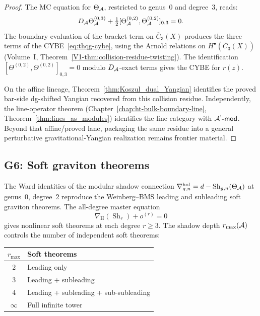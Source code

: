 \begin{proof}
The MC equation for $\Theta_{\mathcal{A}}$, restricted to genus~$0$ and degree~$3$,
reads:
\[
D_{\mathcal{A}} \Theta_{\mathcal{A}}^{(0,3)}
+ \tfrac{1}{2}[\Theta_{\mathcal{A}}^{(0,2)}, \Theta_{\mathcal{A}}^{(0,2)}]_{0,3} = 0.
\]
The boundary evaluation of the bracket term on $\overline{C}_3(X)$
produces the three terms of the CYBE~\eqref{eq:thqg-cybe}, using the
Arnold relations on $H^\bullet(\overline{C}_3(X))$
(Volume~I, Theorem~\ref{V1-thm:collision-residue-twisting}). The
identification $[\Theta^{(0,2)}, \Theta^{(0,2)}]_{0,3} = 0$
modulo $D_{\mathcal{A}}$-exact terms gives the CYBE for $r(z)$.

On the affine lineage, Theorem~\ref{thm:Koszul_dual_Yangian}
identifies the proved bar-side dg-shifted Yangian recovered from this
collision residue. Independently, the line-operator theorem
(Chapter~\ref{chap:ht-bulk-boundary-line},
Theorem~\ref{thm:lines_as_modules}) identifies the line category
with $\mathcal{A}^!\text{-}\mathsf{mod}$. Beyond that affine/proved lane,
packaging the same residue into a general perturbative
gravitational-Yangian realization remains frontier material.
\end{proof}


\subsection{G6: Soft graviton theorems}

\begin{theorem}
The Ward identities of the modular shadow connection
$\nabla^{\mathrm{hol}}_{g,n} = d - \operatorname{Sh}_{g,n}(\Theta_{\mathcal{A}})$
at genus~$0$, degree~$2$ reproduce the Weinberg--BMS leading and subleading
soft graviton theorems. The all-degree master equation
\begin{equation}%
\nabla_{\mathrm{H}}(\operatorname{Sh}_r) + o^{(r)} = 0
\end{equation}
gives nonlinear soft theorems at each degree $r \ge 3$. The shadow depth
$r_{\max}(\mathcal{A})$ controls the number of independent soft theorems:
\begin{center}
\renewcommand{\arraystretch}{1.1}
\small
\begin{tabular}{cl}
$r_{\max}$ & Soft theorems \\
\hline
$2$ & Leading only \\
$3$ & Leading + subleading \\
$4$ & Leading + subleading + sub-subleading \\
$\infty$ & Full infinite tower
\end{tabular}
\end{center}
\end{theorem}

